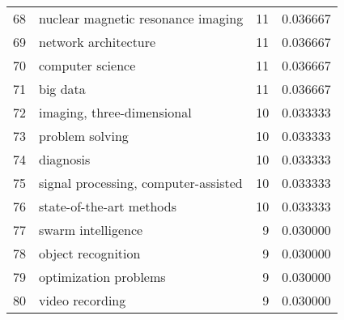 \begin{tabular}{llrr}
68 &       nuclear magnetic resonance imaging &          11 &    0.036667 \\
69 &                     network architecture &          11 &    0.036667 \\
70 &                         computer science &          11 &    0.036667 \\
71 &                                 big data &          11 &    0.036667 \\
72 &               imaging, three-dimensional &          10 &    0.033333 \\
73 &                          problem solving &          10 &    0.033333 \\
74 &                                diagnosis &          10 &    0.033333 \\
75 &     signal processing, computer-assisted &          10 &    0.033333 \\
76 &                 state-of-the-art methods &          10 &    0.033333 \\
77 &                       swarm intelligence &           9 &    0.030000 \\
78 &                       object recognition &           9 &    0.030000 \\
79 &                    optimization problems &           9 &    0.030000 \\
80 &                          video recording &           9 &    0.030000 \\
\bottomrule
\end{tabular}

